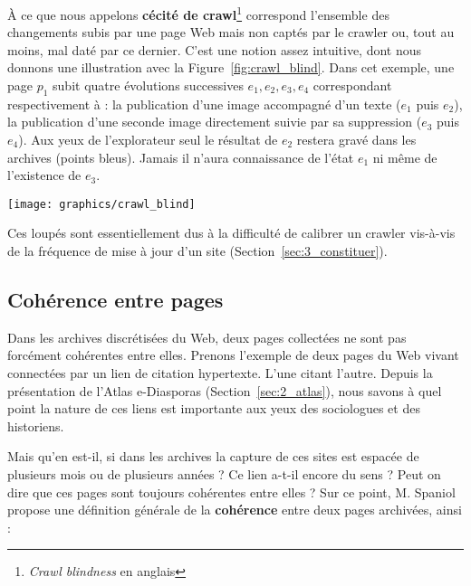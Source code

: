 \documentclass[symmetric,justified,marginals=raggedouter]{tufte-book}
\begin{document}
\noindent À ce que nous appelons \textbf{cécité de crawl}\footnote{\RaggedOuter \textit{Crawl blindness} en anglais} correspond l'ensemble des changements subis par une page Web mais non captés par le crawler ou, tout au moins, mal daté par ce dernier. C'est une notion assez intuitive, dont nous donnons une illustration avec la Figure~\ref{fig:crawl_blind}. Dans cet exemple, une page $p_1$ subit quatre évolutions successives $e_1, e_2, e_3, e_4$ correspondant respectivement à : la publication d'une image accompagné d'un texte ($e_1$ puis $e_2$), la publication d'une seconde image directement suivie par sa suppression ($e_3$ puis $e_4$). Aux yeux de l'explorateur seul le résultat de $e_2$ restera gravé dans les archives (points bleus). Jamais il n'aura connaissance de l'état $e_1$ ni même de l'existence de $e_3$.     

\begin{figure*}%
  \texttt{[image: graphics/crawl\_blind]}
  \caption{Cécité de crawl pour une page $p_1$}
  \label{fig:crawl_blind}
\end{figure*}

\noindent Ces loupés sont essentiellement dus à la difficulté de calibrer un crawler vis-à-vis de la fréquence de mise à jour d'un site (Section~\ref{sec:3_constituer}).

\subsection{Cohérence entre pages}

\noindent Dans les archives discrétisées du Web, deux pages collectées ne sont pas forcément cohérentes entre elles. Prenons l'exemple de deux pages du Web vivant connectées par un lien de citation hypertexte. L'une citant l'autre. Depuis la présentation de l'Atlas e-Diasporas (Section~\ref{sec:2_atlas}), nous savons à quel point la nature de ces liens est importante aux yeux des sociologues et des historiens.

Mais qu'en est-il, si dans les archives la capture de ces sites est espacée de plusieurs mois ou de plusieurs années ? Ce lien a-t-il encore du sens ? Peut on dire que ces pages sont toujours cohérentes entre elles ? Sur ce point, M. Spaniol \citep{spaniol_data_2009} propose une définition générale de la \textbf{cohérence} entre deux pages archivées, ainsi :
\end{document}
